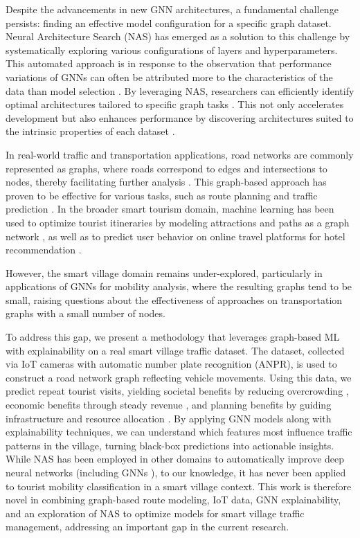 \documentclass[journal]{IEEEtran}
\begin{document}
Despite the advancements in new GNN architectures, a fundamental challenge persists: finding an effective model configuration for a specific graph dataset. Neural Architecture Search (NAS) \cite{gao2019graphnasgraphneuralarchitecture} has emerged as a solution to this challenge by systematically exploring various configurations of layers and hyperparameters. This automated approach is in response to the observation that performance variations of GNNs can often be attributed more to the characteristics of the data than model selection \cite{Zhou2020Review}. By leveraging NAS, researchers can efficiently identify optimal architectures tailored to specific graph tasks \cite{zhang2019heterogeneous}. This not only accelerates development but also enhances performance by discovering architectures suited to the intrinsic properties of each dataset \cite{zoph2017neural}.


In real-world traffic and transportation applications, road networks are commonly represented as graphs, where roads correspond to edges and intersections to nodes, thereby facilitating further analysis \cite{jana2023edge}. This graph-based approach has proven to be effective for various tasks, such as route planning and traffic prediction \cite{li2024survey}. In the broader smart tourism domain, machine learning has been used to optimize tourist itineraries by modeling attractions and paths as a graph network \cite{mangini2021novel}, as well as to predict user behavior on online travel platforms for hotel recommendation \cite{li2023multitask}.

%
%
However, the smart village domain remains under-explored, particularly in applications of GNNs for mobility analysis, where the resulting graphs tend to be small, raising questions about the effectiveness of approaches on transportation graphs with a small number of nodes.
%

To address this gap, we present a methodology that leverages graph-based ML with explainability on a real smart village traffic dataset. The dataset, collected via IoT cameras with automatic number plate recognition (ANPR), is used to construct a road network graph reflecting vehicle movements. Using this data, we predict repeat tourist visits, yielding societal benefits by reducing overcrowding \cite{bichler2021designing}, economic benefits through steady revenue \cite{acharya2023linking}, and planning benefits by guiding infrastructure and resource allocation \cite{alfarhan2022first}. By applying GNN models along with explainability techniques, we can understand which features most influence traffic patterns in the village, turning black-box predictions into actionable insights. While NAS has been employed in other domains to automatically improve deep neural networks (including GNNs \cite{gao2021graph}), to our knowledge, it has never been applied to tourist mobility classification in a smart village context. This work is therefore novel in combining graph-based route modeling, IoT data, GNN explainability, and an exploration of NAS to optimize models for smart village traffic management, addressing an important gap in the current research.
\end{document}
